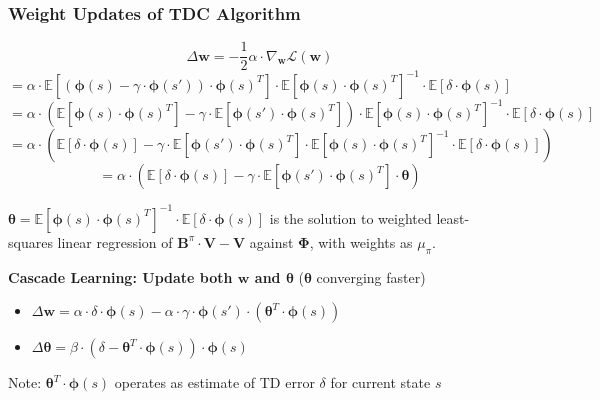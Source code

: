 \documentclass[handout]{beamer}
\newcommand{\bphi}{\bm{\Phi}}
\newcommand{\bb}{\bm{B}^{\pi}}
\newcommand{\bv}{\bm{V}}
\newcommand{\bw}{\bm{w}}
\newcommand{\btheta}{\bm{\theta}}
\begin{document}
\begin{frame}
\frametitle{Weight Updates of TDC Algorithm}
\pause
$$\Delta \bw  = - \frac {1} {2} \alpha \cdot \nabla_{\bw} \mathcal{L}({\bw})$$
$$ = \alpha \cdot \mathbb{E}[(\bm{\phi}(s) - \gamma \cdot \bm{\phi}(s')) \cdot \bm{\phi}(s)^T] \cdot \mathbb{E}[\bm{\phi}(s) \cdot \bm{\phi}(s)^T]^{-1} \cdot \mathbb{E}[\delta \cdot \bm{\phi}(s)]$$
$$ = \alpha \cdot (\mathbb{E}[\bm{\phi}(s) \cdot \bm{\phi}(s)^T] - \gamma \cdot \mathbb{E}[\bm{\phi}(s') \cdot \bm{\phi}(s)^T]) \cdot \mathbb{E}[\bm{\phi}(s) \cdot \bm{\phi}(s)^T]^{-1} \cdot \mathbb{E}[\delta \cdot \bm{\phi}(s)]$$
$$ = \alpha \cdot (\mathbb{E}[\delta \cdot \bm{\phi}(s)] - \gamma \cdot \mathbb{E}[\bm{\phi}(s') \cdot \bm{\phi}(s)^T] \cdot \mathbb{E}[\bm{\phi}(s) \cdot \bm{\phi}(s)^T]^{-1} \cdot \mathbb{E}[\delta \cdot \bm{\phi}(s)])$$
$$ = \alpha \cdot (\mathbb{E}[\delta \cdot \bm{\phi}(s)] - \gamma \cdot \mathbb{E}[\bm{\phi}(s') \cdot \bm{\phi}(s)^T] \cdot \btheta)$$
\pause
\vspace*{2mm}

$\btheta = \mathbb{E}[\bm{\phi}(s) \cdot \bm{\phi}(s)^T]^{-1} \cdot \mathbb{E}[\delta \cdot \bm{\phi}(s)]$ is the solution to weighted least-squares linear regression of $\bb \cdot \bv - \bv$ against $\bphi$, with weights as $\mu_{\pi}$.
\pause
\vspace*{3mm}

{\bf Cascade Learning: Update both $\bw$ and $\btheta$} ($\btheta$ converging faster)
\pause
\begin{itemize}[<+->]
\item $\Delta \bw = \alpha \cdot \delta \cdot \bm{\phi}(s)  - \alpha \cdot \gamma \cdot \bm{\phi}(s') \cdot (\btheta^T \cdot \bm{\phi}(s))$
\item $\Delta \btheta = \beta \cdot (\delta - \btheta^T \cdot \bm{\phi}(s)) \cdot \bm{\phi}(s)$
\end{itemize}
\pause
Note: $\btheta^T \cdot \bm{\phi}(s)$ operates as estimate of TD error $\delta$ for current state $s$

\end{frame}
\end{document}
